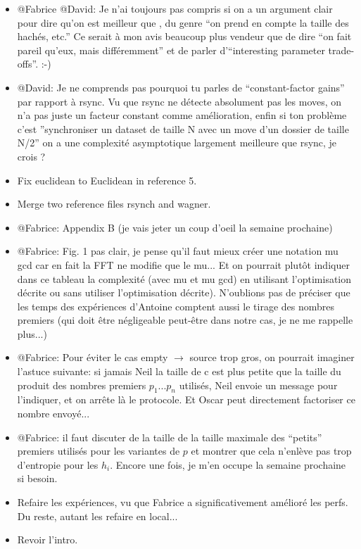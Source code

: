 \documentclass[11pt]{llncs}
\begin{document}
\begin{itemize}
\item @Fabrice @David: Je n'ai toujours pas compris si on a un argument clair
  pour dire qu'on est meilleur que \cite{Mins1}, du genre ``on prend en compte
  la taille des hachés, etc.'' Ce serait à mon avis beaucoup plus vendeur que de
  dire ``on fait pareil qu'eux, mais différemment'' et de parler d'``interesting
  parameter trade-offs''. :-)

\item @David: Je ne comprends pas pourquoi tu parles de ``constant-factor
  gains'' par rapport à rsync. Vu que rsync ne détecte absolument pas les moves,
  on n'a pas juste un facteur constant comme amélioration, enfin si ton problème
  c'est ''synchroniser un dataset de taille N avec un move d'un dossier de
  taille N/2'' on a une complexité asymptotique largement meilleure que rsync,
  je crois ?

\item Fix euclidean to Euclidean in reference 5.\smallskip

\item Merge two reference files rsynch and wagner.\smallskip

\item @Fabrice: Appendix B (je vais jeter un coup d'oeil la semaine prochaine)

\item @Fabrice: Fig. 1 pas clair, je pense qu'il faut mieux créer une notation mu gcd car en fait la FFT ne modifie que le mu... Et on pourrait plut\^ot indiquer dans ce tableau la complexité (avec mu et mu gcd) en utilisant l'optimisation décrite ou sans utiliser l'optimisation décrite). N'oublions pas de préciser que les temps des expériences d'Antoine comptent aussi le tirage des nombres premiers (qui doit \^etre négligeable peut-\^etre dans notre cas, je ne me rappelle plus...)

\item @Fabrice: Pour éviter le cas empty $\rightarrow$ source trop gros, on pourrait imaginer l'astuce suivante: si jamais Neil la taille de c est plus petite que la taille du produit des nombres premiers $p_1$...$p_n$ utilisés, Neil envoie un message pour l'indiquer, et on arr\^ete là le protocole. Et Oscar peut directement factoriser ce nombre envoyé...

\item @Fabrice: il faut discuter de la taille de la taille maximale des ``petits'' premiers utilisés pour les variantes de $p$ et montrer que cela n'enlève pas trop d'entropie pour les $h_i$. Encore une fois, je m'en occupe la semaine prochaine si besoin.

\item Refaire les expériences, vu que Fabrice a significativement amélioré les
  perfs. Du reste, autant les refaire en local...

\item Revoir l'intro.
\end{itemize}
\end{document}
